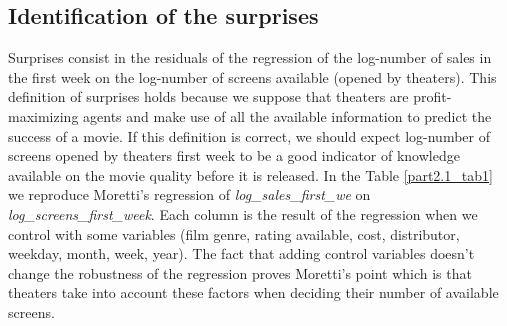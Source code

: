 


\subsection{Identification of the surprises}

Surprises consist in the residuals of the regression of the log-number of sales in the first week on the log-number of screens available (opened by theaters). This definition of surprises holds because we suppose that theaters are profit-maximizing agents and make use of all the available information to predict the success of a movie. If this definition is correct, we should expect log-number of screens opened by theaters first week to be a good indicator of knowledge available on the movie quality before it is released. In the Table \ref{part2.1_tab1} we reproduce Moretti's regression of \textit{log\_sales\_first\_we} on \textit{log\_screens\_first\_week}. Each column is the result of the regression when we control with some variables (film genre, rating available, cost, distributor, weekday, month, week, year). The fact that adding control variables doesn't change the robustness of the regression proves Moretti's point which is that theaters take into account these factors when deciding their number of available screens. 

